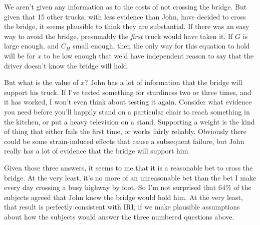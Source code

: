 \documentclass[
  11pt,
  letterpaper,
  DIV=11,
  numbers=noendperiod,
  oneside]{scrartcl}
\begin{document}
We aren't given any information as to the costs of not crossing the
bridge. But given that 15 other trucks, with less evidence than John,
have decided to cross the bridge, it seems plausible to think they are
substantial. If there was an easy way to avoid the bridge, presumably
the \emph{first} truck would have taken it. If \(G\) is large enough,
and \(C_H\) small enough, then the only way for this equation to hold
will be for \(x\) to be low enough that we'd have independent reason to
say that the driver doesn't know the bridge will hold.

But what is the value of \(x\)? John has a lot of information that the
bridge will support his truck. If I've tested something for sturdiness
two or three times, and it has worked, I won't even think about testing
it again. Consider what evidence you need before you'll happily stand on
a particular chair to reach something in the kitchen, or put a heavy
television on a stand. Supporting a weight is the kind of thing that
either fails the first time, or works fairly reliably. Obviously there
could be some strain-induced effects that cause a subsequent
failure, but
John really has a lot of evidence that the bridge will support him.

Given those three answers, it seems to me that it is a reasonable bet to
cross the bridge. At the very least, it's no more of an unreasonable bet
than the bet I make every day crossing a busy highway by foot. So I'm
not surprised that 64\% of the subjects agreed that John knew the bridge
would hold him. At the very least, that result is perfectly consistent
with IRI, if we make plausible assumptions about how the subjects would
answer the three numbered questions above.
\end{document}
